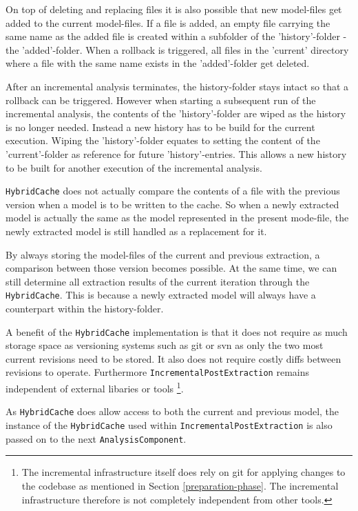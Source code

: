\documentclass[a4paper]{article}
\begin{document}
 On top of deleting and replacing files it is also possible that new model-files get added to the current model-files. If a file is added, an empty file carrying the same name as the added file is created within a subfolder of the 'history'-folder - the 'added'-folder. When a rollback is triggered, all files in the 'current' directory where a file with the same name exists in the 'added'-folder get deleted.
 
After an incremental analysis terminates, the history-folder stays intact so that a rollback can be triggered. 
However when starting a subsequent run of the incremental analysis, the contents of the 'history'-folder are wiped as the history is no longer needed. Instead a new history has to be build for the current execution. Wiping the 'history'-folder equates to setting the content of the 'current'-folder as reference for future 'history'-entries. This allows a new history to be built for another execution of the incremental analysis.
  
 \texttt{Hybrid\-Cache} does not actually compare the contents of a file with the previous version when a model is to be written to the cache. So when a newly extracted model is actually the same as the model represented in the present mode-file, the newly extracted model is still handled as a replacement for it. 
  
 By always storing the model-files of the current and previous extraction, a comparison between those version becomes possible. At the same time, we can still determine all extraction results of the current iteration through the \texttt{Hybrid\-Cache}. This is because a newly extracted model will always have a counterpart within the history-folder.
   
 A benefit of the \texttt{Hybrid\-Cache} implementation is that it does not require as much storage space as versioning systems such as git or svn as only the two most current revisions need to be stored. It also does not require costly diffs between revisions to operate. Furthermore \texttt{Incremental\-Post\-Extraction} remains independent of external libaries or tools \footnote{The incremental infrastructure itself does rely on git for applying changes to the codebase as mentioned in Section \ref{preparation-phase}. The incremental infrastructure therefore is not completely independent from other tools.}.
 
As \texttt{Hybrid\-Cache} does allow access to both the current and previous model, the instance of the \texttt{Hybrid\-Cache} used within \texttt{Incremental\-Post\-Extraction} is also passed on to the next \texttt{Analysis\-Component}. 
  
\end{document}
